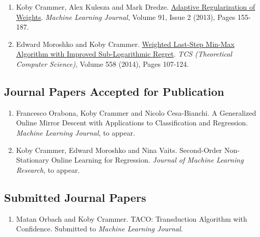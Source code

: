 \documentclass{resume}
\newcommand{\nolineskips}{
\setlength{\parskip}{1pt}
\setlength{\parsep}{1pt}
\setlength{\topsep}{1pt}
\setlength{\partopsep}{1pt}
\setlength{\itemsep}{1pt}}
\begin{document}
\begin{enumerate}
\item
{Koby Crammer}, Alex Kulesza and Mark Dredze.
\href{http://www.springer.com/alert/urltracking.do?id=Lffdd03Mc0e861Sb052601}{Adaptive Regularization of Weights}. 
{\em Machine Learning  Journal}, Volume 91, Issue 2 (2013), Pages 155-187.


\item Edward Moroshko and {Koby Crammer}.
\href{http://www.sciencedirect.com/science/article/pii/S0304397514007063}{Weighted Last-Step Min-Max Algorithm with Improved
  Sub-Logarithmic Regret}.
{\em TCS (Theoretical Computer Science)}, Volume 558 (2014), Pages 107-124.
\end{enumerate}



\subsection*{Journal Papers Accepted for Publication}
\begin{enumerate}
\nolineskips


\item Francesco Orabona, Koby Crammer and Nicolo Cesa-Bianchi. 
 A Generalized Online Mirror Descent with Applications to
   Classification and Regression.
{\em Machine Learning Journal}, to appear.

\item Koby Crammer, Edward Moroshko and Nina Vaits.
Second-Order Non-Stationary Online Learning for Regression.
{\em Journal of Machine Learning Research}, to appear.

\end{enumerate}



\subsection*{Submitted Journal Papers}
\begin{enumerate}
\nolineskips




\item Matan Orbach and Koby Crammer.
TACO: Transduction Algorithm with Confidence.
Submitted to {\em Machine Learning Journal}.



\end{enumerate}
\end{document}
